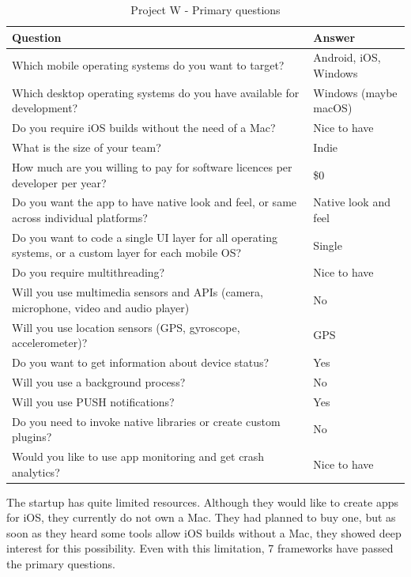 \documentclass[english,master,public,dept460,male,cpdeclaration,oneside]{diploma}
\begin{document}
\begin{table}[!h]
	\centering
	\caption{Project W - Primary questions}
	\label{table:wPrimary}
	\begin{tabular}{p{9cm} | p{4.5cm}}
		\toprule		
		\textbf{Question} &	\textbf{Answer}\\
		\midrule
		Which mobile operating systems do you want to target? &	Android, iOS, Windows \\
		Which desktop operating systems do you have available for development? & Windows (maybe macOS) \\
		Do you require iOS builds without the need of a Mac? & Nice to have \\
		What is the size of your team? & Indie \\
		How much are you willing to pay for software licences per developer per year? & \$0 \\
		Do you want the app to have native look and feel, or same across individual platforms? & Native look and feel \\
		Do you want to code a single UI layer for all operating systems, or a custom layer for each mobile OS? & Single \\
		Do you require multithreading? & Nice to have \\
		Will you use multimedia sensors and APIs (camera, microphone, video and audio player) & No  \\
		Will you use location sensors (GPS, gyroscope, accelerometer)? & GPS \\
		Do you want to get information about device status? & Yes \\
		Will you use a background process? & No \\
		Will you use PUSH notifications? & Yes \\
		Do you need to invoke native libraries or create custom plugins? & No \\
		Would you like to use app monitoring and get crash analytics? & Nice to have \\		
		\midrule
	\end{tabular}
\end{table}

The startup has quite limited resources. Although they would like to create apps for iOS, they currently do not own a Mac. They had planned to buy one, but as soon as they heard some tools allow iOS builds without a Mac, they showed deep interest for this possibility. Even with this limitation, 7 frameworks have passed the primary questions.
\end{document}
